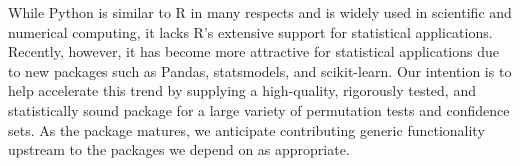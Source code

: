 While Python is similar to R in many respects and is widely used in scientific
and numerical computing, it lacks R's extensive support for statistical
applications.  Recently, however, it has become more attractive for statistical
applications due to new packages such as Pandas, statsmodels, and
scikit-learn.  Our intention is to help accelerate this trend by supplying a
high-quality, rigorously tested, and statistically sound package for a large
variety of permutation tests and confidence sets. As the package matures, we
anticipate contributing generic functionality upstream to the packages we
depend on as appropriate.
